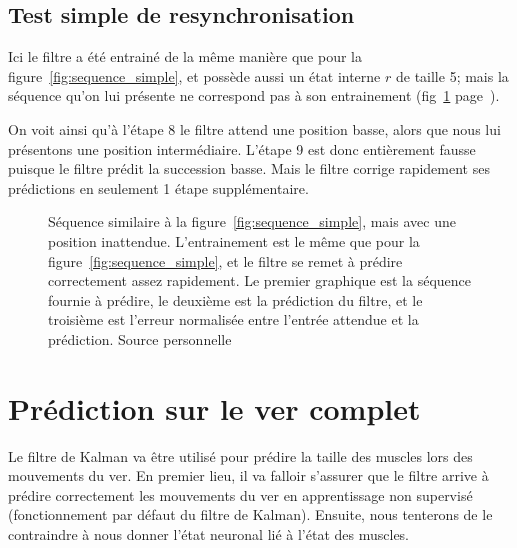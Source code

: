 \subsection{Test simple de resynchronisation} %
\label{sub:Test simple de resynchronisation}

Ici le filtre a été entrainé de la même manière que pour la
figure~\ref{fig:sequence_simple}, et possède aussi un état interne $r$ de
taille 5; mais la séquence qu'on lui présente ne correspond pas à son
entrainement (fig~\ref{fig:sequence_simple_erreur}
page~\pageref{fig:sequence_simple_erreur}).

On voit ainsi qu'à l'étape 8 le filtre attend une position basse, alors que
nous lui présentons une position intermédiaire. L'étape 9 est donc entièrement
fausse puisque le filtre prédit la succession basse. Mais le filtre corrige
rapidement ses prédictions en seulement 1 étape supplémentaire.

\begin{figure}[ht]
   \begin{center}
   \end{center}
   \caption[Prédiction de séquence simple, avec erreur]{Séquence similaire à la
   figure~\ref{fig:sequence_simple}, mais avec une position inattendue.
   L'entrainement est le même que pour la figure~\ref{fig:sequence_simple}, et
   le filtre se remet à prédire correctement assez rapidement. Le premier graphique
   est la séquence fournie à prédire, le deuxième est la prédiction du filtre, et
   le troisième est l'erreur normalisée entre l'entrée attendue et la
   prédiction. Source personnelle}
   \label{fig:sequence_simple_erreur}
\end{figure}



\section{Prédiction sur le ver complet} %
\label{sec:Prédiction sur le ver complet}

Le filtre de Kalman va être utilisé pour prédire la taille des muscles lors des
mouvements du ver. En premier lieu, il va falloir s'assurer que le filtre arrive
à prédire correctement les mouvements du ver en apprentissage non supervisé
(fonctionnement par défaut du filtre de Kalman). Ensuite, nous tenterons de
le contraindre à nous donner l'état neuronal lié à l'état des muscles.

